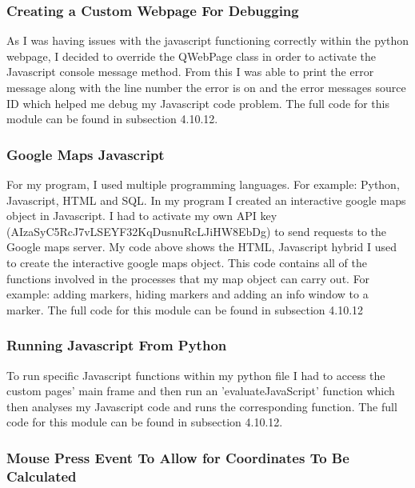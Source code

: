 \subsubsection{Creating a Custom Webpage For Debugging}


As I was having issues with the javascript functioning correctly within the python webpage, I decided to override the QWebPage class in order to activate the Javascript console message method. From this I was able to print the error message along with the line number the error is on and the error messages source ID which helped me debug my Javascript code problem. The full code for this module can be found in subsection 4.10.12.

\subsubsection{Google Maps Javascript}

For my program, I used multiple programming languages. For example: Python, Javascript, HTML and SQL. In my program I created an interactive google maps object in Javascript. I had to activate my own API key (AIzaSyC5RcJ7vLSEYF32KqDusnuRcLJiHW8EbDg) to send requests to the Google maps server. My code above shows the HTML, Javascript hybrid I used to create the interactive google maps object. This code contains all of the functions involved in the processes that my map object can carry out. For example: adding markers, hiding markers and adding an info window to a marker. The full code for this module can be found in subsection 4.10.12



\subsubsection{Running Javascript From Python}

To run specific Javascript functions within my python file I had to access the custom pages' main frame and then run an 'evaluateJavaScript' function which then analyses my Javascript code and runs the corresponding function. The full code for this module can be found in subsection 4.10.12.


\subsubsection{Mouse Press Event To Allow for Coordinates To Be Calculated}

